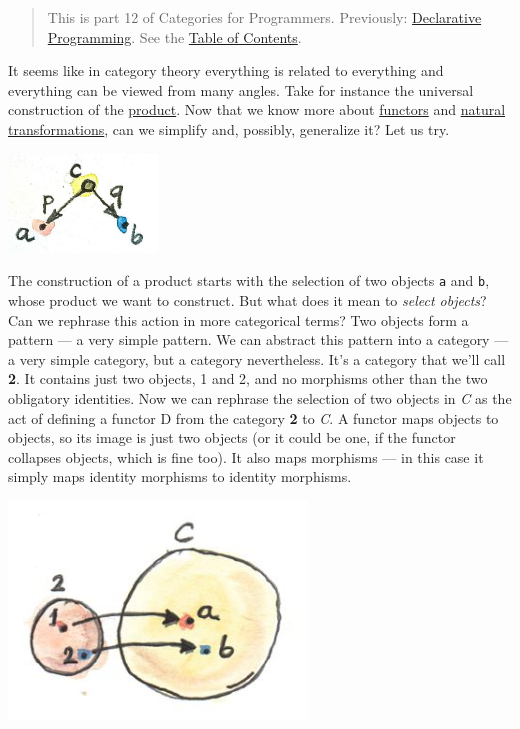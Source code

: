\begin{quote}
This is part 12 of Categories for Programmers. Previously:
\href{https://bartoszmilewski.com/2015/04/15/category-theory-and-declarative-programming/}{Declarative
Programming}. See the
\href{https://bartoszmilewski.com/2014/10/28/category-theory-for-programmers-the-preface/}{Table
of Contents}.
\end{quote}

It seems like in category theory everything is related to everything and
everything can be viewed from many angles. Take for instance the
universal construction of the
\href{https://bartoszmilewski.com/2015/01/07/products-and-coproducts/}{product}.
Now that we know more about
\href{https://bartoszmilewski.com/2015/01/20/functors/}{functors} and
\href{https://bartoszmilewski.com/2015/04/07/natural-transformations/}{natural
transformations}, can we simplify and, possibly, generalize it? Let us
try.

\includegraphics[width=1.56250in]{images/productpattern.jpg}

The construction of a product starts with the selection of two objects
\texttt{a} and \texttt{b}, whose product we want to construct. But what
does it mean to \emph{select objects}? Can we rephrase this action in
more categorical terms? Two objects form a pattern --- a very simple
pattern. We can abstract this pattern into a category --- a very simple
category, but a category nevertheless. It's a category that we'll call
\textbf{2}. It contains just two objects, 1 and 2, and no morphisms
other than the two obligatory identities. Now we can rephrase the
selection of two objects in \emph{C} as the act of defining a functor D
from the category \textbf{2} to \emph{C}. A functor maps objects to
objects, so its image is just two objects (or it could be one, if the
functor collapses objects, which is fine too). It also maps morphisms
--- in this case it simply maps identity morphisms to identity
morphisms.

\includegraphics[width=3.12500in]{images/two.jpg}

